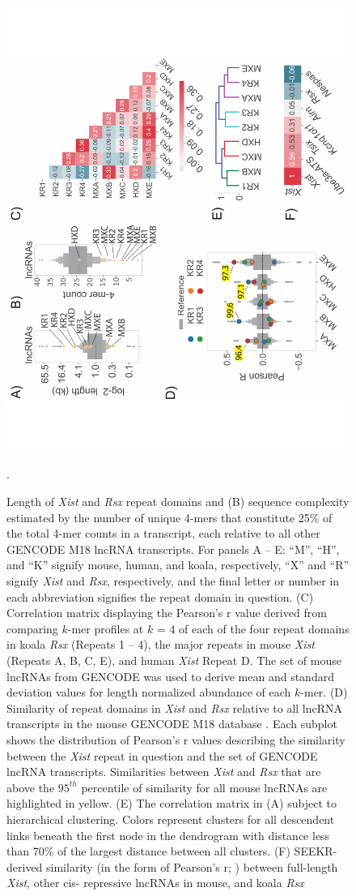 \begin{figure}[!h]
\centering
\includegraphics[angle=-90,width=.8\textwidth]{images/fig2_-01.pdf}
\caption[Domain based sequence similarity]{Length of \emph{Xist} and \emph{Rsx} repeat domains and (B) sequence complexity estimated by the number of unique 4-mers that constitute 25\% of the total 4-mer counts in a transcript, each relative to all other GENCODE M18 lncRNA transcripts. For panels A – E: “M”, “H”, and “K” signify mouse, human, and koala, respectively, “X” and “R” signify \emph{Xist} and \emph{Rsx}, respectively, and the final letter or number in each abbreviation signifies the repeat domain in question. (C) Correlation matrix displaying the Pearson’s r value derived from comparing $k$-mer profiles at $k$ = 4 of each of the four repeat domains in koala \emph{Rsx} (Repeats 1 – 4), the major repeats in mouse \emph{Xist} (Repeats A, B, C, E), and human \emph{Xist} Repeat D. The set of mouse lncRNAs from GENCODE was used to derive mean and standard deviation values for length normalized abundance of each $k$-mer. (D) Similarity of repeat domains in \emph{Xist} and \emph{Rsx} relative to all lncRNA transcripts in the mouse GENCODE M18 database \cite{Derrien2012TheExpression}. Each subplot shows the distribution of Pearson’s r values describing the similarity between the \emph{Xist} repeat in question and the set of GENCODE lncRNA transcripts. Similarities between \emph{Xist} and \emph{Rsx} that are above the $95^{th}$ percentile of similarity for all mouse lncRNAs are highlighted in yellow. (E) The correlation matrix in (A) subject to hierarchical clustering. Colors represent clusters for all descendent links beneath the first node in the dendrogram with distance less than 70\% of the largest distance between all clusters. (F) SEEKR- derived similarity (in the form of Pearson’s r; \cite{Kirk2018FunctionalContent}) between full-length \emph{Xist}, other cis- repressive lncRNAs in mouse, and koala \emph{Rsx} \cite{Johnson2018AdaptationGenome}}. 
\end{figure}

